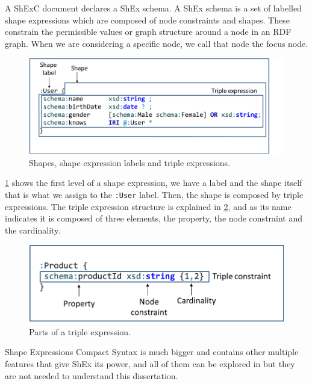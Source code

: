 A ShExC document declares a ShEx schema. A ShEx schema is a set of labelled shape expressions which are composed
of node constraints and shapes. These constrain the permissible values or graph structure around a node in an RDF
graph. When we are considering a specific node, we call that node the focus node.

\begin{figure}
  \includegraphics[scale=0.25]{images/shex-out.png}
  \centering
  \caption[Shapes, shape expression labels and triple expressions]{Shapes, shape expression labels and triple expressions.}
  \label{fig:shex-out-view}
\end{figure}

\cref{fig:shex-out-view} shows the first level of a shape expression, we have a label and the shape itself that is
what we assign to the \texttt{:User} label. Then, the shape is composed by triple expressions. The triple expression
structure is explained in \cref{fig:shex-triple-expression}, and as its name indicates it is composed of three
elements, the property, the node constraint and the cardinality.

\begin{figure}
  \includegraphics[scale=0.25]{images/shex-triple-expression.png}
  \centering
  \caption[Parts of a triple expression]{Parts of a triple expression.}
  \label{fig:shex-triple-expression}
\end{figure}

Shape Expressions Compact Syntax is much bigger and contains other multiple features that give ShEx its power,
and all of them can be explored in \cite{labra-validating-rdf} but they are not needed to understand this
dissertation.

